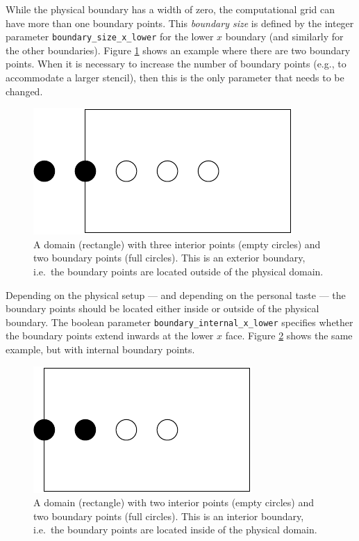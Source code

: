 While the physical boundary has a width of zero, the computational
grid can have more than one boundary points.  This {\emph{boundary
size}} is defined by the integer parameter
{\texttt{boundary\_size\_x\_lower}} for the lower $x$ boundary (and
similarly for the other boundaries).  Figure
{\ref{CactusBase:CoordBase:fig-domain-external}} shows an example
where there are two boundary points.  When it is necessary to increase
the number of boundary points (e.g., to accommodate a larger stencil),
then this is the only parameter that needs to be changed.

\begin{figure}
\begin{center}
\includegraphics[scale=0.75]{domain-external}
\end{center}
\caption{A domain (rectangle) with three interior points (empty
circles) and two boundary points (full circles).  This is an exterior
boundary, i.e.\ the boundary points are located outside of the
physical domain.}
\label{CactusBase:CoordBase:fig-domain-external}
\end{figure}

Depending on the physical setup --- and depending on the personal
taste --- the boundary points should be located either inside or
outside of the physical boundary.  The boolean parameter
{\texttt{boundary\_internal\_x\_lower}} specifies whether the boundary
points extend inwards at the lower $x$ face.  Figure
{\ref{CactusBase:CoordBase:fig-domain-internal}} shows the same
example, but with internal boundary points.

\begin{figure}
\begin{center}
\includegraphics[scale=0.75]{domain-internal}
\end{center}
\caption{A domain (rectangle) with two interior points (empty circles)
and two boundary points (full circles).  This is an interior boundary,
i.e.\ the boundary points are located inside of the physical domain.}
\label{CactusBase:CoordBase:fig-domain-internal}
\end{figure}

